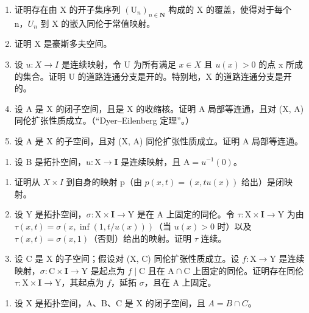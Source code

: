 \begin{enumerate}
\def\labelenumi{\alph{enumi})}
\setcounter{enumi}{1}
\item
  证明存在由 X 的开子集序列 \((\mathrm{U}_{n})_{n\in\mathbf{N}}\) 构成的 X 的覆盖，使得对于每个 n，\(U_{n}\) 到 X 的嵌入同伦于常值映射。
\item
  证明 X 是豪斯多夫空间。
\item
  设 \(u: X \to I\) 是连续映射，令 U 为所有满足 \(x \in X\) 且 \(u(x) > 0\) 的点 x 所成的集合。证明 U 的道路连通分支是开的。特别地，X 的道路连通分支是开的。
\item
  设 A 是 X 的闭子空间，且是 X 的收缩核。证明 A 局部等连通，且对 (X, A) 同伦扩张性质成立。（“Dyer–Eilenberg 定理”。）
\item
  设 A 是 X 的子空间，且对 (X, A) 同伦扩张性质成立。证明 A 局部等连通。
\end{enumerate}

\begin{enumerate}
\def\labelenumi{\arabic{enumi})}
\setcounter{enumi}{18}
\tightlist
\item
  设 B 是拓扑空间，\(u \colon \mathrm{X} \to \mathbf{I}\) 是连续映射，且 \(\mathrm{A} = u^{-1}(0)\)。
\end{enumerate}

\begin{enumerate}
\def\labelenumi{\alph{enumi})}
\item
  证明从 \(X \times I\) 到自身的映射 p（由 \(p(x,t) = (x,tu(x))\) 给出）是闭映射。
\item
  设 Y 是拓扑空间，\(\sigma\colon\mathrm{X}\times\mathbf{I}\to\mathrm{Y}\) 是在 A 上固定的同伦。令 \(\tau\colon\mathrm{X}\times\mathbf{I}\to\mathrm{Y}\) 为由 \(\tau(x,t)=\sigma(x,\inf(1,t/u(x)))\)（当 \(u(x)>0\) 时）以及 \(\tau(x,t)=\sigma(x,1)\)（否则）给出的映射。证明 \(\tau\) 连续。
\item
  设 C 是 X 的子空间；假设对 (X, C) 同伦扩张性质成立。设 \(f \colon \mathrm{X} \to \mathrm{Y}\) 是连续映射，\(\sigma \colon \mathrm{C} \times \mathbf{I} \to \mathrm{Y}\) 是起点为 \(f \mid \mathrm{C}\) 且在 \(\mathrm{A} \cap \mathrm{C}\) 上固定的同伦。证明存在同伦 \(\tau \colon \mathrm{X} \times \mathbf{I} \to \mathrm{Y}\)，其起点为 \(f\)，延拓 \(\sigma\)，且在 \(\mathrm{A}\) 上固定。
\end{enumerate}

\begin{enumerate}
\def\labelenumi{\arabic{enumi})}
\setcounter{enumi}{19}
\tightlist
\item
  设 X 是拓扑空间，A、B、C 是 X 的闭子空间，且 \(A = B \cap C\)。
\end{enumerate}

